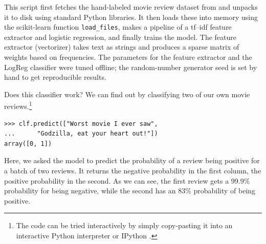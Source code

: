 \documentclass[a4paper]{article}
\begin{document}
%
%

This script first fetches the hand-labeled movie review dataset from
\cite{pang2004} and unpacks it to disk using standard Python libraries.
It then loads these into memory using the scikit-learn function
\texttt{load\_files}, makes a pipeline of a \textsf{tf--idf} feature extractor
\cite{rennie2003tackling} and logistic regression,
and finally trains the model.
The feature extractor (vectorizer) takes text as strings
and produces a sparse matrix of weights based on frequencies.
The parameters for the feature extractor and the LogReg classifier
were tuned offline; the random-number generator seed is set by hand
to get reproducible results.

Does this classifier work?
We can find out by classifying two of our own movie reviews.\footnote{
  The code can be tried interactively by simply copy-pasting it
  into an interactive Python interpreter or IPython \cite{perez2007ipython}.
}

\begin{lstlisting}
>>> clf.predict(["Worst movie I ever saw",
...      "Godzilla, eat your heart out!"])
array([0, 1])
\end{lstlisting}

Here, we asked the model to predict the probability of a review being positive
for a batch of two reviews. It returns the negative probability in the first
column, the positive probability in the second.
As we can see, the first review gets a 99.9\% probability for being negative,
while the second has an 83\% probability of being positive.
\end{document}
